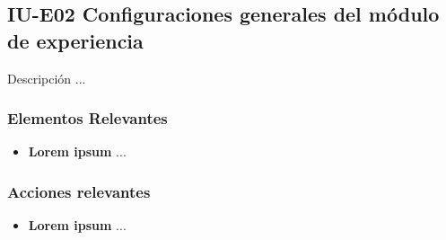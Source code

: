 
\subsection{IU-E02 Configuraciones generales del módulo de experiencia}

 Descripción ...


\subsubsection{Elementos Relevantes}

    \begin{itemize}
    \item {\bf Lorem ipsum}
        ...
    \end{itemize}

\subsubsection{Acciones relevantes}

    \begin{itemize}
    \item {\bf Lorem ipsum}
        ...
    \end{itemize}

\clearpage
